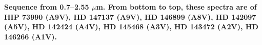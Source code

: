 {\bf Sequence from 0.7–2.55 $\mu$m. From bottom to top, these spectra are of HIP 73990 (A9V), HD 147137 (A9V), HD 146899 (A8V), HD 142097 (A5V), HD 142424 (A4V), HD 145468 (A3V), HD 143472 (A2V), HD 146266 (A1V).
\label{fig:stack-plot-a}}